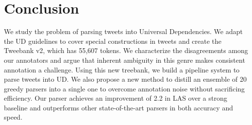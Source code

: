 \documentclass[11pt,a4paper]{article}
\begin{document}

\section{Conclusion}
We study the problem of parsing tweets into Universal Dependencies.
We adapt the UD guidelines to cover 
special constructions in tweets and create
the {\sc Tweebank v2}, which has 55,607 tokens. We characterize the disagreements
among our annotators and argue that inherent ambiguity in this genre
makes
consistent annotation a challenge.  Using this new treebank,
we build a pipeline system to parse tweets into UD. We also 
propose a new method to distill an ensemble of 20 greedy parsers into a single one
to overcome annotation noise without sacrificing efficiency.
Our parser achieves an improvement of 2.2  in LAS over a strong baseline
and outperforms other state-of-the-art parsers in both accuracy and speed.
\end{document}
